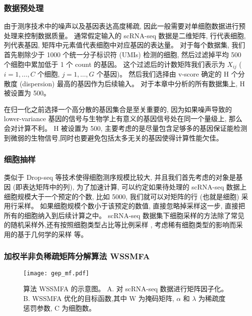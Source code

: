 \subsubsection{数据预处理}
由于测序技术中的噪声以及基因表达高度稀疏, 因此一般需要对单细胞数据进行预处理来控制数据质量。
通常假定输入的 scRNA-seq 数据是二维矩阵, 行代表细胞, 列代表基因, 矩阵中元素值代表细胞中对应基因的表达量。
对于每个数据集, 我们首先剔除少于 1000 个统一分子标识符 (UMIs) 检测的细胞,
然后过滤掉平均 500 个细胞中累加低于 1 个 count 的基因。
这个过滤后的计数矩阵我们表示为 $X_{ij}$ ($i=1,\ldots,C$ 个细胞, $j=1,\ldots,G$ 个基因)。
然后我们选择由 v-score \cite{klein2015droplet} 确定的 H 个分散度 (dispersion) 最高的基因作为后续输入。
对于本章中分析的所有数据集上, H 被设置为 500。

在归一化之前选择一个高分散的基因集合是至关重要的, 
因为如果噪声导致的 lower-variance 基因的信号与生物学上有意义的基因信号处在同一个量级上, 那么会对计算不利。 
H 被设置为 500, 主要考虑的是尽量包含足够多的基因保证能检测到微弱的生物信号,同时也要避免包括太多无关的基因使得计算性能欠佳。

\subsubsection{细胞抽样}
类似于 Drop-seq 等技术使得细胞测序规模比较大, 并且我们首先考虑的对象是基因 (即表达矩阵中的列), 
为了加速计算, 可以约定如果待处理的 scRNA-seq 数据上细胞规模大于一个预定的个数, 比如 5000,
我们就可以对矩阵的行 (也就是细胞) 采用行采样。
如果细胞规模个数小于该预定的数值, 直接忽略掉采样这一步, 
直接把所有的细胞纳入到后续计算之中。
 scRNA-seq 数据集下细胞采样的方法除了常见的随机采样外,还有按照细胞类型占比等比例采样 \cite{sinha2018dropclust},
考虑稀有细胞类型的影响而采用的基于几何学的采样 \cite{hie2019geometric} 等。

\subsubsection{加权半非负稀疏矩阵分解算法 WSSMFA}

\begin{figure}[!htbp]
    \centering
    \texttt{[image: gep\_mf.pdf]}
    \caption{
        算法 WSSMFA 的示意图。
        A. 对 scRNA-seq 数据进行矩阵因子化。
        B. WSSMFA 优化的目标函数,其中 W 为掩码矩阵, $\alpha$ 和 $\lambda$ 为稀疏度惩罚参数, C 为细胞数。
    }
    \label{fig:gep-mf}
\end{figure}

